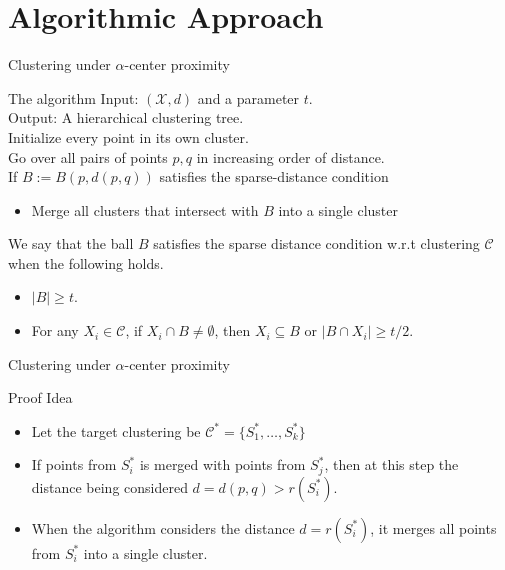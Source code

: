 \documentclass{beamer}
\newcommand{\mc}{\mathcal}
\begin{document}
\section{Algorithmic Approach}


\begin{frame}{Clustering under $\alpha$-center proximity}
	\begin{block}{The algorithm}
	  Input: $(\mc X, d)$ and a parameter $t$.\\
	  Output: A hierarchical clustering tree.\\
	  \vspace{0.1in}Initialize every point in its own cluster.\\
	  Go over all pairs of points $p, q$ in increasing order of distance.\\
	  If $B := B(p, d(p, q))$ satisfies the sparse-distance condition
	  \begin{itemize}
	  	\item Merge all clusters that intersect with $B$ into a single cluster
	  \end{itemize}
    \end{block}
        
    \vspace{0.2in}We say that the ball $B$ satisfies the sparse distance condition w.r.t clustering $\mc C$ when the following holds.
	\begin{itemize}
	  \item $|B| \ge t$.
	  \item For any $X_i \in \mc C$, if $X_i \cap B \neq \emptyset$, then $X_i \subseteq B$ or $|B \cap X_i| \ge t/2$.
	\end{itemize}
\end{frame}

\begin{frame}{Clustering under $\alpha$-center proximity}
	\begin{block}{Proof Idea}
	\begin{itemize}
	  \item Let the target clustering be $\mc C^* = \{S_1^*, \ldots, S_k^*\}$
	  \item If points from $S_i^*$ is merged with points from $S_j^*$,  then at this step the distance being considered $d = d(p,q) > r(S_i^*)$.	
      \item When the algorithm considers the distance $d = r(S_i^*)$, it merges all points from $S_i^*$ into a single cluster. 
    \end{itemize} 	
	\end{block}
\end{frame}
\end{document}
